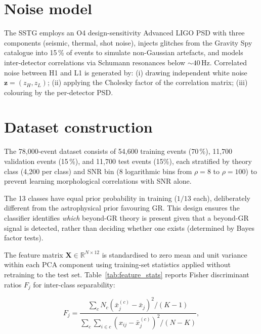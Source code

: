 \documentclass[11pt,a4paper, english]{book}
\theoremstyle{plain}
\theoremstyle{definition}
\numberwithin{equation}{chapter}
\numberwithin{figure}{chapter}
\numberwithin{table}{chapter}
\begin{document}
\section{Noise model}
\label{sec:noise-model}

The SSTG employs an O4 design-sensitivity Advanced LIGO PSD 
\cite{LIGO_T1800044} with three components (seismic, thermal, 
shot noise), injects glitches from the Gravity Spy catalogue \cite{Zevin_2017} into 15\,\% of events to simulate non-Gaussian artefacts, and models inter-detector correlations via Schumann resonances below $\sim\!40$\,Hz. Correlated noise between H1 and L1 is generated by: (i) drawing independent white noise $\mathbf{z} = (z_H, z_L)$; (ii) applying the Cholesky factor of the correlation matrix; (iii) colouring by the per-detector PSD.

\section{Dataset construction}
\label{sec:dataset_construction}

The 78,000-event dataset consists of 54,600 training events (70\,\%), 11,700 validation events (15\,\%), and 11,700 test events (15\%), each stratified by theory class (4,200 per class) and SNR bin (8 logarithmic bins from $\rho = 8$ to $\rho = 100$) to prevent learning morphological correlations with SNR alone.

The 13 classes have equal prior probability in training ($1/13$ each), deliberately different from the astrophysical prior favouring GR. This design ensures the classifier identifies \emph{which} beyond-GR theory is present given that a beyond-GR signal is detected, rather than deciding whether one exists (determined by Bayes factor tests).

The feature matrix $\mathbf{X} \in \mathbb{R}^{N \times 12}$ is standardised to zero mean and unit variance within each PCA component using training-set statistics applied without retraining to the test set. Table~\ref{tab:feature_stats} reports Fisher discriminant ratios $F_j$ for inter-class separability:

\begin{equation}
  \label{eq:fisher_ratio}
  F_j = \frac{\sum_c N_c(\bar{x}_j^{(c)} - \bar{x}_j)^2 / (K-1)}
             {\sum_c\sum_{i\in c}(x_{ij} - \bar{x}_j^{(c)})^2 / (N-K)},
\end{equation}
\end{document}
